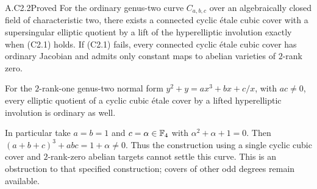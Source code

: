 \begin{claim}{A.C2.2}{Proved}
For the ordinary genus-two curve $C_{a,b,c}$ over an algebraically
closed field of characteristic two, there exists a connected cyclic
\'etale cubic cover with a supersingular elliptic quotient by a lift
of the hyperelliptic involution exactly when (C2.1) holds.
If (C2.1) fails, every connected cyclic \'etale cubic cover has
ordinary Jacobian and admits only constant maps to abelian varieties
of $2$-rank zero.

For the $2$-rank-one genus-two normal form
$y^2+y=a x^3+b x+c/x$, with $ac\ne0$, every elliptic quotient
of a cyclic cubic \'etale cover by a lifted hyperelliptic
involution is ordinary as well.

In particular take $a=b=1$ and $c=\alpha\in\mathbb F_4$ with
$\alpha^2+\alpha+1=0$. Then $(a+b+c)^3+abc=1+\alpha\ne0$.
Thus the construction using a single cyclic cubic cover and
$2$-rank-zero abelian targets cannot settle this curve. This is an
obstruction to that specified construction; covers of other odd
degrees remain available.
\end{claim}

